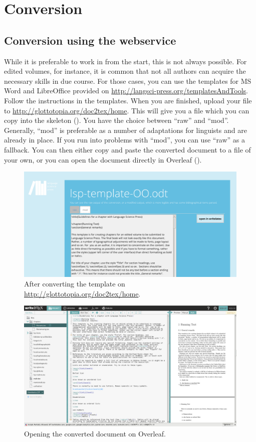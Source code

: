 \chapter{Conversion} 
\section{Conversion using the webservice}
While it is preferable to work in \latex from the start, this is not always possible. For edited volumes, for instance, it is common that not all authors can acquire the necessary skills in due course. For those cases, you can use the templates for MS Word and LibreOffice provided on \url{http://langsci-press.org/templatesAndTools}. Follow the instructions in the templates. When you are finished, upload your file to \url{http://glottotopia.org/doc2tex/home}. This will give you a file which you can copy into the skeleton (). You have the choice between ``raw'' and ``mod''. Generally,  ``mod'' is preferable as a number of adaptations for linguists and \lsp are already in place. If you run into problems with ``mod'', you can use  ``raw'' as a fallback. You can then either copy and paste the converted document to a file of your own, or you can open the document directly in Overleaf ().

\begin{figure}
\includegraphics[width=\textwidth]{converter.png} 
\caption{After converting the template on \url{http://glottotopia.org/doc2tex/home}.}
\label{fig:conversion:glottotopia}
\end{figure}

\begin{figure}
\includegraphics[width=\textwidth]{conversionwritelatex.png} 
\caption{Opening the converted document on Overleaf.}
\label{fig:conversion:overleaf}
\end{figure}

